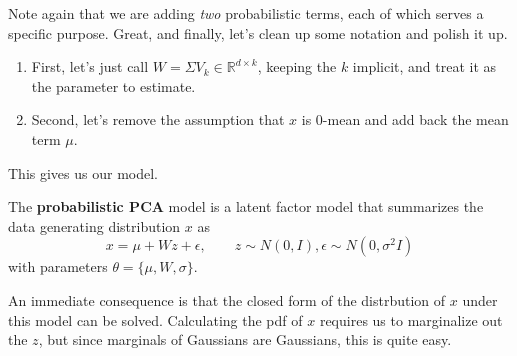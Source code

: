   Note again that we are adding \textit{two} probabilistic terms, each of which serves a specific purpose. Great, and finally, let's clean up some notation and polish it up. 
  \begin{enumerate}
    \item First, let's just call $W = \Sigma V_k \in \mathbb{R}^{d \times k}$, keeping the $k$ implicit, and treat it as the parameter to estimate. 
    \item Second, let's remove the assumption that $x$ is $0$-mean and add back the mean term $\mu$. 
  \end{enumerate} 

  This gives us our model. 

  \begin{definition} 
    The \textbf{probabilistic PCA} model is a latent factor model that summarizes the data generating distribution $x$ as  
    \begin{equation}
      x = \mu + W z + \epsilon, \qquad z \sim N(0, I), \epsilon \sim N(0, \sigma^2 I) 
    \end{equation} 
    with parameters $\theta = \{\mu, W, \sigma\}$. 
  \end{definition} 

  An immediate consequence is that the closed form of the distrbution of $x$ under this model can be solved. Calculating the pdf of $x$ requires us to marginalize out the $z$, but since marginals of Gaussians are Gaussians, this is quite easy. 

